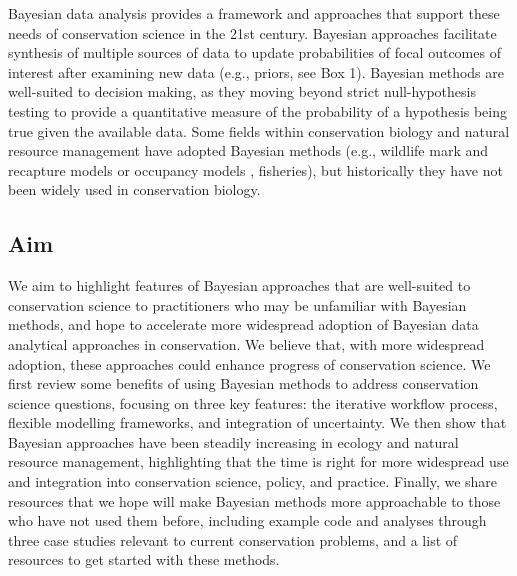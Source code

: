 \documentclass{article}
\begin{document}
\par Bayesian data analysis provides a framework and approaches that support these needs of conservation science in the 21st century. Bayesian approaches facilitate synthesis of multiple sources of data to update probabilities of focal outcomes of interest after examining new data (e.g., priors, see Box 1). Bayesian methods are well-suited to decision making, as they moving beyond strict null-hypothesis testing to
provide a quantitative measure of the probability of a hypothesis being true given the available data. %
Some fields within conservation biology and natural resource management have adopted Bayesian methods (e.g., wildlife mark and recapture models or occupancy models \citep{Kery2011}, fisheries\citep{Doll2018}), but historically they have not been widely used in conservation biology.

\subsection*{Aim} We aim to highlight features of Bayesian approaches that are well-suited to conservation science to practitioners who may be unfamiliar with Bayesian methods, and hope to accelerate more widespread adoption of Bayesian data analytical approaches in conservation. We believe that, with more widespread adoption, these approaches could enhance progress of conservation science. We first review some benefits of using Bayesian methods to address conservation science questions, focusing on three key features: the iterative workflow process, flexible modelling frameworks, and integration of uncertainty. We then show that Bayesian approaches have been steadily increasing in ecology and natural resource management, highlighting that the time is right for more widespread use and integration into conservation science, policy, and practice. Finally, we share resources that we hope will make Bayesian methods more approachable to those who have not used them before, including example code and analyses through three case studies relevant to current conservation problems, and a list of resources to get started with these methods.
\end{document}

